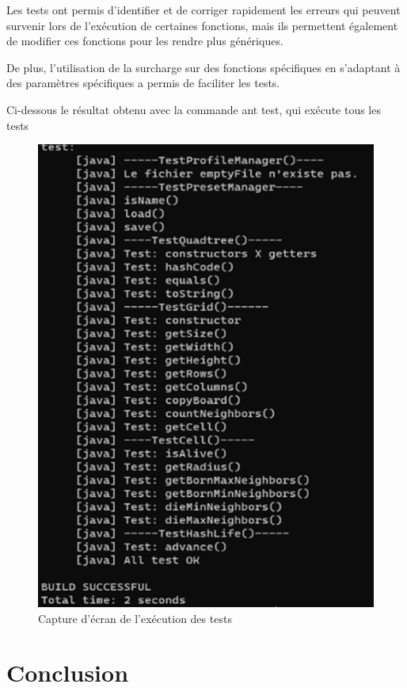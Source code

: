 \documentclass[12pt]{article}
\begin{document}
			Les tests ont permis d'identifier et de corriger rapidement les erreurs qui peuvent survenir lors de l'exécution de certaines fonctions, mais ils permettent également de modifier ces fonctions pour les rendre plus génériques.
			
			De plus, l'utilisation de la surcharge sur des fonctions spécifiques en s'adaptant à des paramètres spécifiques a permis de faciliter les tests.
			
			Ci-dessous le résultat obtenu avec la commande ant test, qui exécute tous les tests
			\begin{figure}[!h]
				\centering
				\includegraphics{images/tests.png}
				\caption{Capture d'écran de l'exécution des tests}
			\end{figure}
			\newpage
			
			\section{Conclusion}
\end{document}
